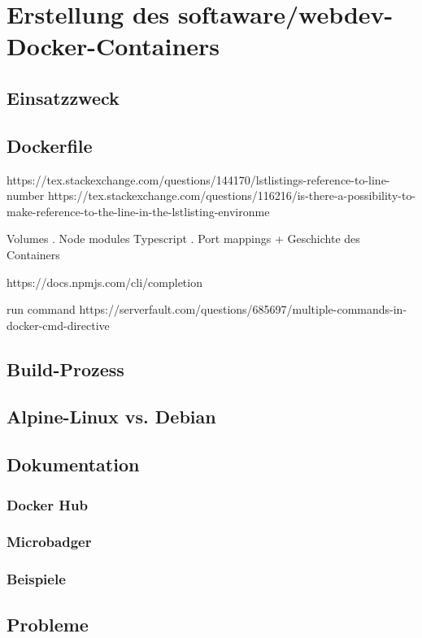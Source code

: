 \chapter{Erstellung des softaware/webdev-Docker-Containers}
\label{cha:implementation}

\section{Einsatzzweck}

\section{Dockerfile}
\label{sec:dockerfile}
https://tex.stackexchange.com/questions/144170/lstlistings-reference-to-line-number
https://tex.stackexchange.com/questions/116216/is-there-a-possibility-to-make-reference-to-the-line-in-the-lstlisting-environme

Volumes
. Node modules Typescript
. Port mappings + Geschichte des Containers

https://docs.npmjs.com/cli/completion

run command
https://serverfault.com/questions/685697/multiple-commands-in-docker-cmd-directive


\section{Build-Prozess}
\label{sec:build-process}


\section{Alpine-Linux vs. Debian}
\label{sec:alpine-vs-debian}


\section{Dokumentation}
\label{sec:documentation}

\subsection{Docker Hub}
\label{sub:dockerhub}
\subsection{Microbadger}
\label{sub:microbadger}
\subsection{Beispiele}
\label{sub:examples}


\section{Probleme}
\label{sec:container-problems}
